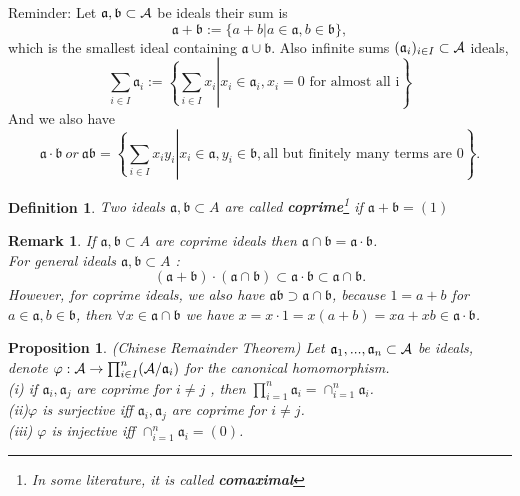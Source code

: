 \documentclass[11pt]{article}
\newtheorem{prop}[thm]{Proposition}
\newtheorem{dfn}[thm]{Definition}
\newtheorem{rmk}[thm]{Remark}
\newcommand{\sca}{{\mathfrak a}}
\newcommand{\scb}{{\mathfrak b}}
\newcommand{\cala}{{\cal A}}
\begin{document}
Reminder: Let $\sca,\scb \subset \cala$ be ideals their sum is 
$$
\sca+\scb:=\{a+b|a\in \sca, b\in \scb\},
$$
which is the smallest ideal containing $\sca\cup\scb$.
Also infinite sums $(\sca_i)_{i\in I}\subset \cala$ ideals,
$$
\sum_{i\in I }\sca_i :=\left.\left\{\sum_{i\in I}x_i \right| x_i\in \sca_i,  x_i =0 \text{ for almost all i}\right\}
$$
And we also have
$$
\sca\cdot \scb\ or\ \sca\scb=\left.\left\{\sum_{i\in I}x_i y_i\right|x_i \in \sca , y_i\in \scb, \text{all but finitely many terms are }0\right\}.
$$
\begin{dfn}
Two ideals $\sca, \scb\subset A$ are called \textbf{coprime}\footnote{In some literature, it is called \textbf{comaximal}} if $\sca+\scb=(1)$ 
\end{dfn}
\begin{rmk}
If $\sca,\scb\subset A$ are coprime ideals then $\sca\cap \scb =\sca\cdot \scb$.\\
For general ideals $\sca,\scb\subset A$ :
$$
(\sca+\scb)\cdot(\sca\cap \scb)\subset \sca\cdot \scb\subset \sca\cap \scb.
$$
However, for coprime ideals, we also have $\sca\scb \supset \sca\cap\scb$, because $1=a+b$ for $a\in\sca, b\in \scb$, then
$\forall x\in \sca\cap\scb$ we have $x=x\cdot 1=x(a+b)=xa+xb\in \sca\cdot \scb$.
\end{rmk}

\begin{prop}\label{thm:Chinese_remainder}(Chinese Remainder Theorem)
Let $\sca_1,...,\sca_n \subset \cala$ be ideals, denote $\varphi: \cala\rightarrow \prod_{i\in I}^n(\cala/\sca_{i})$ for the canonical homomorphism.\\
(i) if $\sca_i,\sca_j$ are coprime for $i\neq j$ , then $\prod_{i=1}^n\sca_i=\cap_{i=1}^n\sca_i$.\\
(ii)$\varphi$ is surjective iff $\sca_i,\sca_j$ are coprime for $i\neq  j$.\\
(iii) $\varphi$ is injective iff $\cap_{i=1}^n\sca_i=(0)$.
\end{prop}
\end{document}
